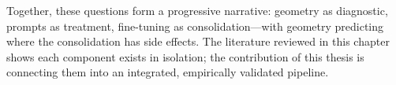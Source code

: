 Together, these questions form a progressive narrative: geometry as diagnostic, prompts as treatment, fine-tuning as consolidation---with geometry predicting where the consolidation has side effects.  The literature reviewed in this chapter shows each component exists in isolation; the contribution of this thesis is connecting them into an integrated, empirically validated pipeline.
